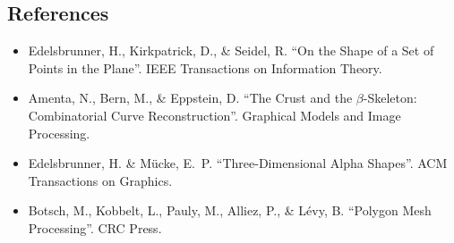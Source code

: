 \subsection{References}
\begin{itemize}
\item Edelsbrunner, H., Kirkpatrick, D., \& Seidel, R. \cite{edelsbrunner1983} ``On the Shape of a Set of Points in the Plane''. IEEE Transactions on Information Theory.
\item Amenta, N., Bern, M., \& Eppstein, D. \cite{amenta1998} ``The Crust and the $\beta$-Skeleton: Combinatorial Curve Reconstruction''. Graphical Models and Image Processing.
\item Edelsbrunner, H. \& M\"ucke, E.~P. \cite{edelsbrunner1994} ``Three-Dimensional Alpha Shapes''. ACM Transactions on Graphics.
\item Botsch, M., Kobbelt, L., Pauly, M., Alliez, P., \& L\'evy, B. \cite{botsch2010} ``Polygon Mesh Processing''. CRC Press.
\end{itemize}
